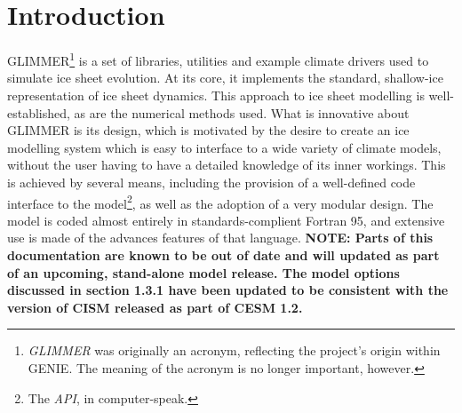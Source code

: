 \section{Introduction}
%
GLIMMER\footnote{{\it GLIMMER} was originally an acronym, reflecting the project's origin within GENIE. The meaning of the acronym is no longer important, however.} is a set of libraries, utilities and example climate drivers used to simulate ice sheet evolution. At its core, it implements the standard, shallow-ice representation of ice sheet dynamics. This approach to ice sheet modelling is well-established, as are the numerical methods used. What is innovative about GLIMMER is its design, which is motivated by the desire to create an ice modelling system which is easy to interface to a wide variety of climate models, without the user having to have a detailed knowledge of its inner workings. This is achieved by several means, including the provision of a well-defined code interface to the model\footnote{The {\it API}, in computer-speak.}, as well as the adoption of a very modular design. The model is coded almost entirely in standards-complient Fortran 95, and extensive use is made of the advances features of that language. {\bf NOTE: Parts of this documentation are known to be out of date and will updated as part of an upcoming, stand-alone model release. The model options discussed in section 1.3.1 have been updated to be consistent with the version of CISM released as part of CESM 1.2. }
%
